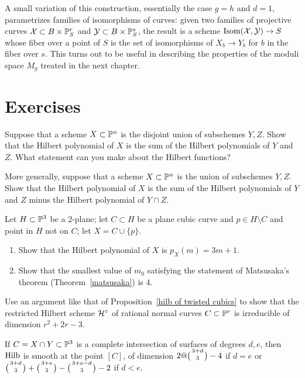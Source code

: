 A small variation of this construction, essentially the case $g=h$
and $d=1$, parametrizes families of
isomorphisms of curves: given two families of projective curves $\cX
\subset B \times \PP^r_{S}$ and $\mathcal{Y} \subset B\times \PP^s_{S}$,
%
the result is a scheme $\Isom(\cX, \mathcal{Y}) \to S$ whose
fiber over a point of $S$ is the set of isomorphisms of $X_{b}\to Y_{b}$
for $b$ in the fiber over $s$.
This turns out to be useful in describing the properties of the moduli
space $M_{g}$ treated in the
next chapter.

\section{Exercises}

\begin{exercise}
\label{deg of disjoint union}
Suppose that a scheme $X\subset \PP^n$ is the disjoint union of subschemes
$Y,Z$. Show that the
Hilbert polynomial
of
$X$ is the sum of the Hilbert polynomials of $Y$ and $Z$. What statement
%
%
can you make about the
Hilbert functions?
\end{exercise}

\begin{exercise}
More generally, suppose that a scheme $X\subset \PP^n$ is the union of
subschemes $Y,Z$. Show that the Hilbert polynomial of
$X$ is the sum of the Hilbert polynomials of $Y$ and $Z$ minus the
Hilbert polynomial of $Y\cap Z$.
\end{exercise}

\begin{exercise}
Let $H \subset \PP^3$ be a 2-plane; let $C \subset H$ be a
plane cubic
%
%
curve and $p \in H \setminus C$ and point in $H$ not on $C$; let $X =
C \cup \{p\}$.
\begin{enumerate}
\item Show that the Hilbert polynomial of $X$ is $p_X(m) = 3m+1$.
\item Show that the smallest value of $m_0$ satisfying the statement of
Matsusaka's theorem (Theorem~\ref{matsusaka})
%
 is 4.
\end{enumerate}\label{tnih7.3}
\end{exercise}

\begin{exercise}
\label{rational normal hilbert}
Use an  argument like that of Proposition~\ref{hilb of twisted cubics}
to show that the restricted Hilbert scheme $\cH^\circ$ of rational normal
%
curves $C \subset \PP^r$ is irreducible of dimension $r^2+2r-3$.
\end{exercise}

\begin{exercise}
\label{hilb at a ci}
If $C = X\cap Y\subset \PP^3$ is a
%
complete intersection
 of surfaces of
degrees $d,e$, then
$\Hilb$ is smooth at the point $[C]$, of dimension $2@\tbinom{3+d}{3}-4$
if $d=e$
or $\tbinom{3+d}{3} +\tbinom{3+e}{3} -\tbinom{3+e-d}{3} -2$ if $d<e$.
\end{exercise}

